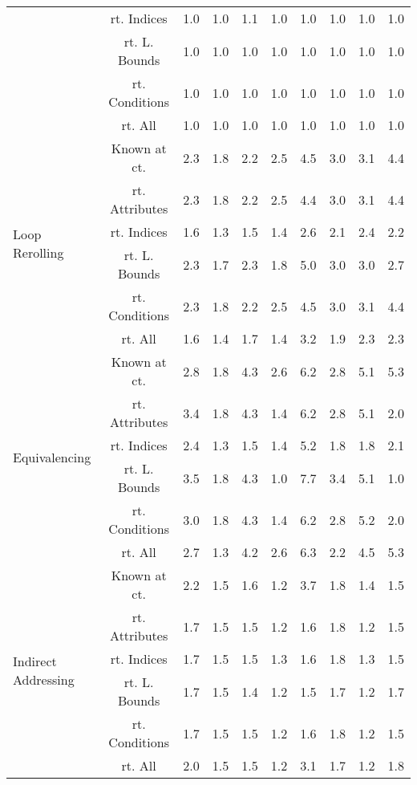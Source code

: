 \documentclass{article}
\begin{document}
\begin{longtable}{|p{2cm}||c|c|c|c|c|c|c|c|c|}
 & rt. Indices & 1.0 & 1.0 & 1.1 & 1.0 & 1.0 & 1.0 & 1.0 & 1.0\\ \cline{2-10}
 & rt. L. Bounds & 1.0 & 1.0 & 1.0 & 1.0 & 1.0 & 1.0 & 1.0 & 1.0\\ \cline{2-10}
 & rt. Conditions & 1.0 & 1.0 & 1.0 & 1.0 & 1.0 & 1.0 & 1.0 & 1.0\\ \cline{2-10}
 & rt. All & 1.0 & 1.0 & 1.0 & 1.0 & 1.0 & 1.0 & 1.0 & 1.0\\ \cline{2-10}
\hline
\multirow{6}{*}{ \parbox{2cm}{Loop Rerolling}} & Known at ct. & 2.3 & 1.8 & 2.2 & 2.5 & 4.5 & 3.0 & 3.1 & 4.4\\ \cline{2-10}
 & rt. Attributes & 2.3 & 1.8 & 2.2 & 2.5 & 4.4 & 3.0 & 3.1 & 4.4\\ \cline{2-10}
 & rt. Indices & 1.6 & 1.3 & 1.5 & 1.4 & 2.6 & 2.1 & 2.4 & 2.2\\ \cline{2-10}
 & rt. L. Bounds & 2.3 & 1.7 & 2.3 & 1.8 & 5.0 & 3.0 & 3.0 & 2.7\\ \cline{2-10}
 & rt. Conditions & 2.3 & 1.8 & 2.2 & 2.5 & 4.5 & 3.0 & 3.1 & 4.4\\ \cline{2-10}
 & rt. All & 1.6 & 1.4 & 1.7 & 1.4 & 3.2 & 1.9 & 2.3 & 2.3\\ \cline{2-10}
\hline
\multirow{6}{*}{ \parbox{2cm}{Equivalencing}} & Known at ct. & 2.8 & 1.8 & 4.3 & 2.6 & 6.2 & 2.8 & 5.1 & 5.3\\ \cline{2-10}
 & rt. Attributes & 3.4 & 1.8 & 4.3 & 1.4 & 6.2 & 2.8 & 5.1 & 2.0\\ \cline{2-10}
 & rt. Indices & 2.4 & 1.3 & 1.5 & 1.4 & 5.2 & 1.8 & 1.8 & 2.1\\ \cline{2-10}
 & rt. L. Bounds & 3.5 & 1.8 & 4.3 & 1.0 & 7.7 & 3.4 & 5.1 & 1.0\\ \cline{2-10}
 & rt. Conditions & 3.0 & 1.8 & 4.3 & 1.4 & 6.2 & 2.8 & 5.2 & 2.0\\ \cline{2-10}
 & rt. All & 2.7 & 1.3 & 4.2 & 2.6 & 6.3 & 2.2 & 4.5 & 5.3\\ \cline{2-10}
\hline
\multirow{6}{*}{ \parbox{2cm}{Indirect Addressing}} & Known at ct. & 2.2 & 1.5 & 1.6 & 1.2 & 3.7 & 1.8 & 1.4 & 1.5\\ \cline{2-10}
 & rt. Attributes & 1.7 & 1.5 & 1.5 & 1.2 & 1.6 & 1.8 & 1.2 & 1.5\\ \cline{2-10}
 & rt. Indices & 1.7 & 1.5 & 1.5 & 1.3 & 1.6 & 1.8 & 1.3 & 1.5\\ \cline{2-10}
 & rt. L. Bounds & 1.7 & 1.5 & 1.4 & 1.2 & 1.5 & 1.7 & 1.2 & 1.7\\ \cline{2-10}
 & rt. Conditions & 1.7 & 1.5 & 1.5 & 1.2 & 1.6 & 1.8 & 1.2 & 1.5\\ \cline{2-10}
 & rt. All & 2.0 & 1.5 & 1.5 & 1.2 & 3.1 & 1.7 & 1.2 & 1.8\\ \cline{2-10}
\hline
\end{longtable}
\end{document}
